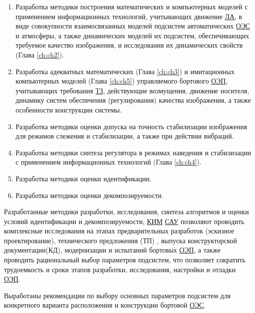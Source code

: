 \begin{enumerate}
\item Разработка методики построения математических и компьютерных моделей с применением информационных технологий, учитывающих движение \hyperref[acroLA]{ЛА}, в виде совокупности взаимосвязанных моделей подсистем автоматических  \hyperref[acroEOS]{ОЭС} и атмосферы, а также динамических моделей их подсистем, обеспечивающих требуемое качество изображения, и исследования их динамических свойств (Глава \ref{ch:ch2}). 
\item Разработка адекватных математических (Глава \ref{ch:ch3}) и имитационных компьютерных моделей (Глава \ref{ch:ch5}) управляемого бортового  \hyperref[acroEOS]{ОЭП}, учитывающих требования  \hyperref[acroTZ]{ТЗ}, действующие возмущения, движение носителя, динамику систем обеспечения (регулирования) качества изображения, а также особенности конструкции системы. 
\item Разработка методики оценки  допуска на точность стабилизации изображения для режимов слежения и стабилизации, а также при действии вибраций.
\item Разработка методики синтеза регулятора в режимах наведения и стабилизации с применением информационных технологий (Глава \ref{ch:ch4}). 
\item Разработка методики оценки идентификации.
\item Разработка методики оценки декомпозируемости.
\end{enumerate}

{\influence} 

Разработанные методики разработки, исследования, синтеза алгоритмов и оценки условий идентификации и декомпозируемости, \hyperref[acroCSM]{КИМ} \hyperref[acroSAU]{САУ} позволяют проводить комплексные исследования на этапах предварительных разработок (эскизное проектирование), технического предложения (ТП) , выпуска конструкторской документации(КД), модернизации и испытаний бортовых \hyperref[acroEOS]{ОЭП}, а также проводить рациональный выбор параметров подсистем, что позволяет сократить трудоемкость и сроки этапов разработки, исследования, настройки и отладки \hyperref[acroEOS]{ОЭП}. 

Выработаны рекомендации по выбору основных параметров подсистем для конкретного варианта расположения и конструкции бортовой  \hyperref[acroEOS]{ОЭС}.

\begin{comment}
{\methods} \todo{методы исследования}\ldots
\end{comment}

